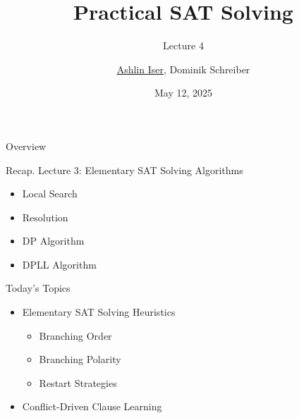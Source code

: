 \documentclass[t]{sdqbeamer}
\title{Practical SAT Solving}
\subtitle{Lecture 4 \unimp{\normalfont -- Elementary SAT Solving Heuristics, Conflict-Driven Clause Learning}}
\author{\underline{Ashlin Iser}, Dominik Schreiber}
\date{May 12, 2025}
\begin{document}
\begin{frame}[title white horizontal, picture=logos/blender-render, kitlogo=rgb]
	\titlepage
\end{frame}

\begin{frame}{Overview}
	\begin{block}{Recap. Lecture 3: Elementary SAT Solving Algorithms}
		\begin{itemize}\setlength{\itemsep}{1ex}
			\item Local Search
			\item Resolution
			\item DP Algorithm
			\item DPLL Algorithm
		\end{itemize}
	\end{block}
	\pause
	\begin{block}{Today's Topics}
		\begin{itemize}\setlength{\itemsep}{1ex}
			\item Elementary SAT Solving Heuristics
			\begin{itemize}
				\item Branching Order
				\item Branching Polarity
				\item Restart Strategies
			\end{itemize}
			\item Conflict-Driven Clause Learning
		\end{itemize}
	\end{block}
\end{frame}
\end{document}
